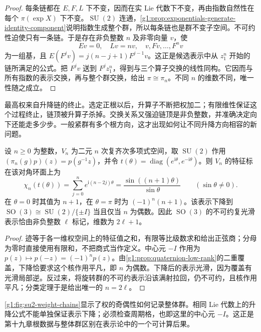 \begin{proof}
	每条链都在 \(E,F,L\) 下不变，因而在实 Lie 代数下不变，再由指数自然性在每个 \(\pi(\exp X)\) 下不变。\(\operatorname{SU}(2)\) 连通，\cref{g1:prop:exponentials-generate-identity-component}说明指数生成整个群，所以每条链也是群不变子空间。不可约性迫使只有一条链。于是存在非负整数 \(n\) 及非零向量 \(v\)，使
	\[
		Ev=0,\quad Lv=nv,\quad
		v,Fv,\ldots,F^nv
	\]
	为一组基，且 \(E(F^jv)=j(n-j+1)F^{j-1}v\)。这正是候选表示中从 \(z_1^n\) 开始的链所满足的公式。把 \(F^jv\) 送到 \(F^jz_1^n\)，得到与三个算子交换的线性同构。它因而与所有指数的表示交换，再与整个群交换，给出 \(\pi\cong\pi_n\)。不同 \(n\) 的维数不同，唯一性随之成立。
\end{proof}

最高权来自升降链的终止。选定正根以后，升算子不断把权加二；有限维性保证这个过程终止，链顶被升算子杀掉。交换关系又强迫链顶是非负整数，并准确决定向下还能走多少步。一般紧群有多个根方向，这才出现如何让不同升降方向相容的新问题。

\begin{corollary}\label{g1:cor:su2-character-so3-descent}
	设 \(n\ge0\) 为整数，\(V_n\) 为二元 \(n\) 次复齐次多项式空间，取 \(\operatorname{SU}(2)\) 作用 \((\pi_n(g)p)(z)=p(g^{-1}z)\)，并令 \(t(\theta)=\operatorname{diag}(e^{\mathrm{i}\theta},e^{-\mathrm{i}\theta})\)。则 \(V_n\) 的特征标在该对角环面上为
	\[
		\chi_n(t(\theta))=\sum_{j=0}^n e^{\mathrm{i}(n-2j)\theta}
		=\frac{\sin((n+1)\theta)}{\sin\theta}\qquad(\sin\theta\ne0).
	\]
	在 \(\theta=0\) 时其值为 \(n+1\)，在 \(\theta=\pi\) 时为 \((-1)^n(n+1)\)。该表示下降到 \(\operatorname{SO}(3)\cong\operatorname{SU}(2)/\{\pm I\}\) 当且仅当 \(n\) 为偶数。因此 \(\operatorname{SO}(3)\) 的不可约复光滑表示恰由非负整数 \(\ell\) 标记，维数为 \(2\ell+1\)。
\end{corollary}
\begin{proof}
	迹等于各一维权空间上的特征值之和，有限等比级数求和给出正弦商；分母为零时直接使用有限和，不把商式当作定义。中心元 \(-I\) 作用为 \(p(z)\mapsto p(-z)=(-1)^np(z)\)。由\cref{g1:prop:quaternion-low-rank}的二重覆盖，下降恰要求这个核作用平凡，即 \(n\) 为偶数。下降后的表示光滑，因为覆盖有光滑局部逆。反过来，将旋转群的不可约表示沿该满射拉回，仍不可约，且核作用平凡；分类定理于是给出唯一的 \(n=2\ell\)。
\end{proof}



\cref{g1:fig:su2-weight-chains}显示了权的奇偶性如何记录整体群。相同 Lie 代数上的升降公式不能单独保证表示下降；必须检查周期格，也即这里的中心元 \(-I\)。这正是第十九章根数据与整体群区别在表示论中的一个可计算后果。

